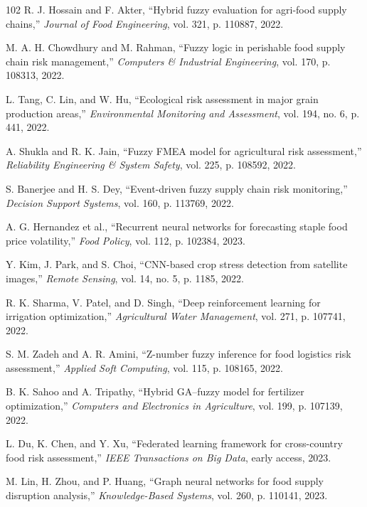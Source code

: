 \documentclass[preprint,12pt]{elsarticle}
\begin{document}
\begin{thebibliography}{102}
		R. J. Hossain and F. Akter, ``Hybrid fuzzy evaluation for agri-food supply chains,'' \emph{Journal of Food Engineering}, vol. 321, p. 110887, 2022.
		
		M. A. H. Chowdhury and M. Rahman, ``Fuzzy logic in perishable food supply chain risk management,'' \emph{Computers \& Industrial Engineering}, vol. 170, p. 108313, 2022.
		
		L. Tang, C. Lin, and W. Hu, ``Ecological risk assessment in major grain production areas,'' \emph{Environmental Monitoring and Assessment}, vol. 194, no. 6, p. 441, 2022.
		
		A. Shukla and R. K. Jain, ``Fuzzy FMEA model for agricultural risk assessment,'' \emph{Reliability Engineering \& System Safety}, vol. 225, p. 108592, 2022.
		
		S. Banerjee and H. S. Dey, ``Event-driven fuzzy supply chain risk monitoring,'' \emph{Decision Support Systems}, vol. 160, p. 113769, 2022.
		
		A. G. Hernandez et al., ``Recurrent neural networks for forecasting staple food price volatility,'' \emph{Food Policy}, vol. 112, p. 102384, 2023.
		
		Y. Kim, J. Park, and S. Choi, ``CNN-based crop stress detection from satellite images,'' \emph{Remote Sensing}, vol. 14, no. 5, p. 1185, 2022.
		
		R. K. Sharma, V. Patel, and D. Singh, ``Deep reinforcement learning for irrigation optimization,'' \emph{Agricultural Water Management}, vol. 271, p. 107741, 2022.
		
		S. M. Zadeh and A. R. Amini, ``Z-number fuzzy inference for food logistics risk assessment,'' \emph{Applied Soft Computing}, vol. 115, p. 108165, 2022.
		
		B. K. Sahoo and A. Tripathy, ``Hybrid GA--fuzzy model for fertilizer optimization,'' \emph{Computers and Electronics in Agriculture}, vol. 199, p. 107139, 2022.
		
		L. Du, K. Chen, and Y. Xu, ``Federated learning framework for cross-country food risk assessment,'' \emph{IEEE Transactions on Big Data}, early access, 2023.
		
		M. Lin, H. Zhou, and P. Huang, ``Graph neural networks for food supply disruption analysis,'' \emph{Knowledge-Based Systems}, vol. 260, p. 110141, 2023.
		

\end{thebibliography}
\end{document}
